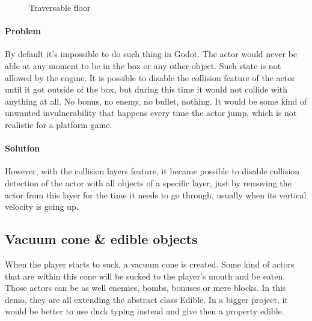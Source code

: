 \documentclass[10pt,a4paper]{article}
\begin{document}
\begin{figure}[h]
\centering
{}
\caption{Traversable floor}
\label{fig:traversable_floor}
\end{figure}

\paragraph{Problem}
By default it's impossible to do such thing in Godot. The actor would never be able at any moment to be in the box or any other object. Such state is not allowed by the engine.
It is possible to disable the collision feature of the actor until it got outside of the box, but during this time it would not collide with anything at all. No bonus, no enemy, no bullet, nothing. It would be some kind of unwanted invulnerability that happens every time the actor jump, which is not realistic for a platform game.
\paragraph{Solution}
However, with the collision layers feature, it became possible to disable collision detection of the actor with all objects of a specific layer, just by removing the actor from this layer for the time it needs to go through, usually when its vertical velocity is going up.

\subsection{Vacuum cone \& edible objects}
When the player starts to suck, a vacuum cone is created. Some kind of actors that are within this cone will be sucked to the player's mouth and be eaten. Those actors can be as well enemies, bombs, bonuses or mere blocks. In this demo, they are all extending the abstract class Edible. In a bigger project, it would be better to use duck typing instead and give then a property edible.
\end{document}
